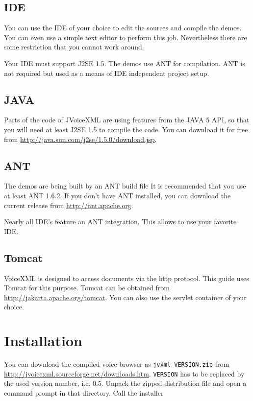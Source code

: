 \documentclass[11pt,a4paper]{article}
\begin{document}
\subsection{IDE}
\label{sec:ide}

You can use the IDE of your choice to edit the sources and compile the 
demos. You can even use a simple text editor to perform this job.
Nevertheless there are some restriction that you cannot work around.

Your IDE must support J2SE 1.5. The demos use ANT for compilation.
ANT is not required but used as a means of IDE independent project
setup.

\subsection{JAVA}
\label{sec:java}

Parts of the code of JVoiceXML are using features from the JAVA 5 API, so that
you will need at least J2SE 1.5 to compile the code. You can download it
for free from \url{http://java.sun.com/j2se/1.5.0/download.jsp}.

\subsection{ANT}
\label{sec:ant}

The demos are being built by an ANT build file It is recommended that
you use at least ANT 1.6.2. 
If you don't have ANT installed, you can download the current release
from \url{http://ant.apache.org}.

Nearly all IDE's feature an ANT integration. This allows to use
your favorite IDE.

\subsection{Tomcat}
\label{sec:tomcat}

VoiceXML is designed to access documents via the http protocol.
This guide uses Tomcat for this purpose. Tomcat can be obtained
from \url{http://jakarta.apache.org/tomcat}. You can also use
the servlet container of your choice.

\section{Installation}

You can download the compiled voice browser as \texttt{jvxml-VERSION.zip} from 
\url{http://jvoicexml.sourceforge.net/downloads.htm}.
\texttt{VERSION} has to be replaced by the used version number, i.e. 0.5.
Unpack the zipped distribution file and open a command prompt in that
directory. Call the installer 
\end{document}
